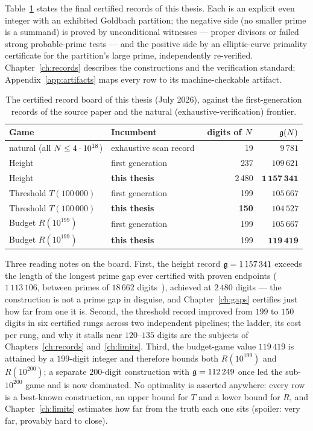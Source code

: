 Table~\ref{tab:board} states the final certified records of this
thesis. Each is an explicit even integer with an exhibited Goldbach
partition; the negative side (no smaller prime is a summand) is proved
by unconditional witnesses --- proper divisors or failed strong
probable-prime tests --- and the positive side by an elliptic-curve
primality certificate for the partition's large prime, independently
re-verified. Chapter~\ref{ch:records} describes the constructions and
the verification standard; Appendix~\ref{app:artifacts} maps every row
to its machine-checkable artifact.

\begin{table}[h]
\centering\small
\caption{The certified record board of this thesis (July 2026), against
the first-generation records of the source paper and the natural
(exhaustive-verification) frontier.}\label{tab:board}
\begin{tabular}{llrr}
\toprule
Game & Incumbent & digits of $N$ & $\mathfrak{g}(N)$\\
\midrule
natural (all $N\le4\cdot10^{18}$) & exhaustive scan record~\cite{OeS} & 19 & $9\,781$\\
\midrule
Height & first generation & 237 & $109\,621$\\
Height & \textbf{this thesis} & 2\,480 & $\mathbf{1\,157\,341}$\\
\midrule
Threshold $T(100\,000)$ & first generation & 199 & $105\,667$\\
Threshold $T(100\,000)$ & \textbf{this thesis} & \textbf{150} & $104\,527$\\
\midrule
Budget $R(10^{199})$ & first generation & 199 & $105\,667$\\
Budget $R(10^{199})$ & \textbf{this thesis} & 199 & $\mathbf{119\,419}$\\
\bottomrule
\end{tabular}
\end{table}

Three reading notes on the board. First, the height record
$\mathfrak{g}=1\,157\,341$ exceeds the length of the longest prime gap ever
certified with proven endpoints ($1\,113\,106$, between primes of
$18\,662$ digits~\cite{GapList}), achieved at $2\,480$ digits --- the
construction is not a prime gap in disguise, and
Chapter~\ref{ch:gaps} certifies just how far from one it is. Second,
the threshold record improved from $199$ to $150$ digits in six
certified rungs across two independent pipelines; the ladder, its cost
per rung, and why it stalls near $120$--$135$ digits are the subjects of
Chapters~\ref{ch:records} and~\ref{ch:limits}. Third, the budget-game
value $119\,419$ is attained by a $199$-digit integer and therefore
bounds both $R(10^{199})$ and $R(10^{200})$; a separate $200$-digit
construction with $\mathfrak{g}=112\,249$ once led the sub-$10^{200}$ game and is
now dominated. No optimality is asserted anywhere: every row is a
best-known construction, an upper bound for $T$ and a lower bound for
$R$, and Chapter~\ref{ch:limits} estimates how far from the truth each
one sits (spoiler: very far, provably hard to close).

